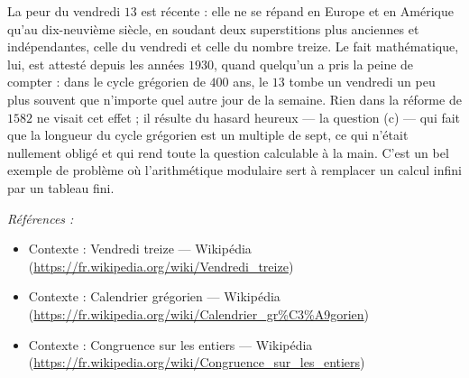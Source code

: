 \documentclass[11pt]{article}
\newenvironment{refs}{\par\small\noindent\emph{Références :}\begin{itemize}\setlength\itemsep{0pt}}{\end{itemize}\normalsize}
\begin{document}
\noindent La peur du vendredi $ 13 $ est récente : elle ne se répand en Europe et en
Amérique qu'au dix-neuvième siècle, en soudant deux superstitions plus anciennes et
indépendantes, celle du vendredi et celle du nombre treize. Le fait mathématique, lui, est
attesté depuis les années $ 1930 $, quand quelqu'un a pris la peine de compter : dans le
cycle grégorien de $ 400 $ ans, le $ 13 $ tombe un vendredi un peu plus souvent que
n'importe quel autre jour de la semaine. Rien dans la réforme de $ 1582 $ ne visait cet
effet ; il résulte du hasard heureux --- la question (c) --- qui fait que la longueur du cycle
grégorien est un multiple de sept, ce qui n'était nullement obligé et qui rend toute la
question calculable à la main. C'est un bel exemple de problème où l'arithmétique modulaire
sert à remplacer un calcul infini par un tableau fini.

\begin{refs}
\item Contexte : Vendredi treize --- Wikipédia (\url{https://fr.wikipedia.org/wiki/Vendredi_treize})
\item Contexte : Calendrier grégorien --- Wikipédia (\url{https://fr.wikipedia.org/wiki/Calendrier_gr%C3%A9gorien})
\item Contexte : Congruence sur les entiers --- Wikipédia (\url{https://fr.wikipedia.org/wiki/Congruence_sur_les_entiers})
\end{refs}

\bigskip
\end{document}
